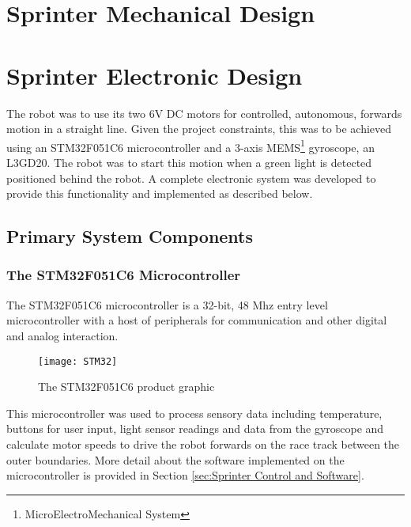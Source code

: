 \section{Sprinter Mechanical Design}
\label{sec:Sprinter Mechanical Design}

\clearpage
\section{Sprinter Electronic Design}
\label{sec:Sprinter Electronic Design}
  The robot was to use its two 6V DC motors for controlled, autonomous, forwards motion in a straight line. Given the project constraints, this was to be achieved using an STM32F051C6 microcontroller and a 3-axis MEMS\footnote{MicroElectroMechanical System} gyroscope, an L3GD20. The robot was to start this motion when a green light is detected positioned behind the robot. A complete electronic system was developed to provide this functionality and implemented as described below.

  \subsection{Primary System Components}
  \label{sub:Primary System Components}
    \subsubsection{The STM32F051C6 Microcontroller}
    \label{subs:The STM32F051C6 Microcontroller}
      The STM32F051C6 microcontroller is a 32-bit, 48 Mhz entry level microcontroller\textsuperscript{\cite{stm32f051c6Datasheet}} with a host of peripherals for communication and other digital and analog interaction.

      \begin{figure}[H]
        \begin{center}
          \texttt{[image: STM32]}
          \caption{The STM32F051C6 product graphic}
          \label{fig:STM32}
        \end{center}
      \end{figure}

      This microcontroller was used to process sensory data including temperature, buttons for user input, light sensor readings and data from the gyroscope and calculate motor speeds to drive the robot forwards on the race track between the outer boundaries. More detail about the software implemented on the microcontroller is provided in Section \ref{sec:Sprinter Control and Software}.


